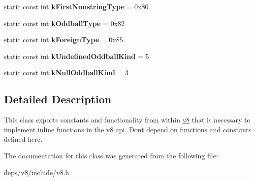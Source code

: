 \begin{DoxyCompactItemize}
\item 
\hypertarget{classv8_1_1internal_1_1_internals_a6f4a54927b01a11f444fb2f00b47ca1d}{}static const int {\bfseries k\+First\+Nonstring\+Type} = 0x80\label{classv8_1_1internal_1_1_internals_a6f4a54927b01a11f444fb2f00b47ca1d}

\item 
\hypertarget{classv8_1_1internal_1_1_internals_a13081e936f8c96472f1b1496c70d4dc1}{}static const int {\bfseries k\+Oddball\+Type} = 0x82\label{classv8_1_1internal_1_1_internals_a13081e936f8c96472f1b1496c70d4dc1}

\item 
\hypertarget{classv8_1_1internal_1_1_internals_a263195f36f9e8ee64af70dc267a85d55}{}static const int {\bfseries k\+Foreign\+Type} = 0x85\label{classv8_1_1internal_1_1_internals_a263195f36f9e8ee64af70dc267a85d55}

\item 
\hypertarget{classv8_1_1internal_1_1_internals_a39072b9e0ffea4031f4a1c514208b20d}{}static const int {\bfseries k\+Undefined\+Oddball\+Kind} = 5\label{classv8_1_1internal_1_1_internals_a39072b9e0ffea4031f4a1c514208b20d}

\item 
\hypertarget{classv8_1_1internal_1_1_internals_a72243c5512cb5cab9d10b6f29e775180}{}static const int {\bfseries k\+Null\+Oddball\+Kind} = 3\label{classv8_1_1internal_1_1_internals_a72243c5512cb5cab9d10b6f29e775180}

\end{DoxyCompactItemize}


\subsection{Detailed Description}
This class exports constants and functionality from within \hyperlink{namespacev8}{v8} that is necessary to implement inline functions in the \hyperlink{namespacev8}{v8} api. Don\textquotesingle{}t depend on functions and constants defined here. 

The documentation for this class was generated from the following file\+:\begin{DoxyCompactItemize}
\item 
deps/v8/include/v8.\+h\end{DoxyCompactItemize}
